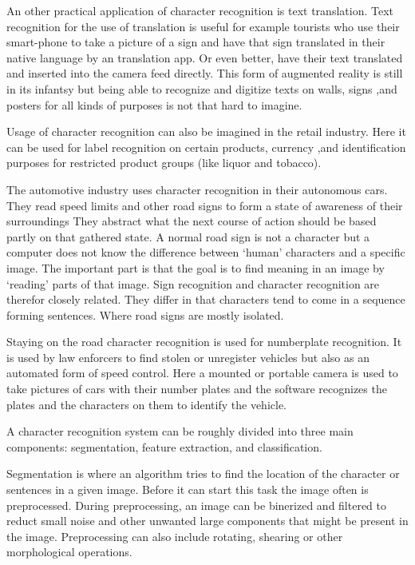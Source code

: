 An other practical application of character recognition is text translation. Text recognition for the use of translation is useful for example tourists who use their smart-phone to take a picture of a sign and have that sign translated in their native language by an translation app. Or even better, have their text translated and inserted into the camera feed directly. This form of augmented reality is still in its infantsy but being able to recognize and digitize texts on walls, signs ,and posters for all kinds of purposes is not that hard to imagine. 

Usage of character recognition can also be imagined in the retail industry. Here it can be used for label recognition on certain products, currency ,and identification purposes for restricted product groups (like liquor and tobacco).

The automotive industry uses character recognition in their autonomous cars. They read speed limits and other road signs to form a state of awareness of their surroundings They abstract what the next course of action should be based partly on that gathered state. A normal road sign is not a character but a computer does not know the difference between `human' characters and a specific image. The important part is that the goal is to find meaning in an image by `reading' parts of that image. Sign recognition and character recognition are therefor closely related. They differ in that characters tend to come in a sequence forming sentences. Where road signs are mostly isolated.

Staying on the road character recognition is used for numberplate recognition. It is used by law enforcers to find stolen or unregister vehicles but also as an automated form of speed control. Here a mounted or portable camera is used to take pictures of cars with their number plates and the software recognizes the plates and the characters on them to identify the vehicle. 


A character recognition system can be roughly divided into three main components: segmentation, feature extraction, and classification.

Segmentation is where an algorithm tries to find the location of the character or sentences in a given image. Before it can start this task the image often is preprocessed. During preprocessing, an image can be binerized and filtered to reduct small noise and other unwanted large components that might be present in the image. Preprocessing can also include rotating, shearing or other morphological operations.

